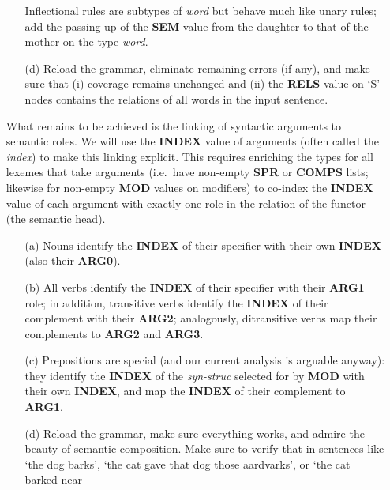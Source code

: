 \documentclass[10pt]{article}
\newcommand{\att}[1]{{\mbox{\scriptsize {\bf #1}}}}
\begin{document}
\begin{enumerate}
\begin{itemize}
                Inflectional rules are subtypes of {\it word} but
                behave much like unary rules; add the passing up of the
                \att{SEM} value from the daughter to that of the mother
                on the type {\it word}.
          \item [(d)]
                Reload the grammar, eliminate remaining errors (if
                any), and make sure that (i) coverage remains unchanged
                and (ii) the \att{RELS} value on `S' nodes contains the
                relations of all words in the input sentence.
        \end{itemize}
  \item []
        What remains to be achieved is the linking of syntactic
        arguments to semantic roles.  We will use the \att{INDEX} value
        of arguments (often called the {\em index\/}) to make this
        linking explicit. 
        This requires enriching the types for all lexemes that take
        arguments (i.e.\ have non-empty \att{SPR} or \att{COMPS} lists;
        likewise for non-empty \att{MOD} values on modifiers)
        to co-index the \att{INDEX} value of each argument with exactly
        one role in the relation of the functor (the semantic head).
        \begin{itemize}
          \item [(a)]
                Nouns identify the \att{INDEX} of their specifier with
                their own \att{INDEX} (also their \att{ARG0}).
          \item [(b)]
                All verbs identify the \att{INDEX} of their specifier
                with their \att{ARG1} role; in addition, transitive
                verbs identify the \att{INDEX} of their complement with
                their \att{ARG2}; analogously, ditransitive verbs map
                their complements to \att{ARG2} and \att{ARG3}.
          \item [(c)]
                Prepositions are special (and our current analysis is
                arguable anyway): they identify the \att{INDEX} of the
                {\it syn-struc} selected for by \att{MOD} with their
                own \att{INDEX}, and map the \att{INDEX} of their
                complement to \att{ARG1}.
          \item [(d)]
                Reload the grammar, make sure everything works, and
                admire the beauty of semantic composition.  Make sure
                to verify that in sentences like `the dog barks', `the
                cat gave that dog those aardvarks', or `the cat barked near

\end{itemize}
\end{enumerate}
\end{document}

